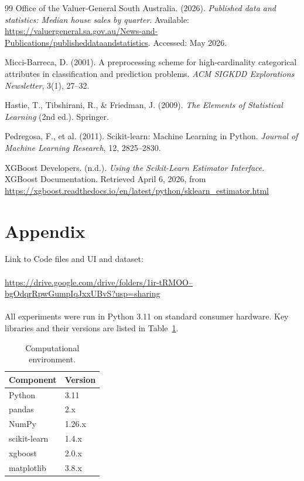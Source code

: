 \documentclass[a4paper,12pt]{article}
\begin{document}
\begin{thebibliography}{99}
Office of the Valuer-General South Australia. (2026). \emph{Published data and statistics: Median house sales by quarter}. Available: \url{https://valuergeneral.sa.gov.au/News-and-Publications/publisheddataandstatistics}. Accessed: May 2026.

Micci-Barreca, D. (2001). A preprocessing scheme for high-cardinality categorical attributes in classification and prediction problems. \emph{ACM SIGKDD Explorations Newsletter}, 3(1), 27--32.

Hastie, T., Tibshirani, R., \& Friedman, J. (2009). \emph{The Elements of Statistical Learning} (2nd ed.). Springer.

Pedregosa, F., et al. (2011). Scikit-learn: Machine Learning in Python. \emph{Journal of Machine Learning Research}, 12, 2825--2830.

XGBoost Developers. (n.d.). \emph{Using the Scikit-Learn Estimator Interface}. XGBoost Documentation. Retrieved April 6, 2026, from \url{https://xgboost.readthedocs.io/en/latest/python/sklearn_estimator.html}

\end{thebibliography}

\appendix

\section{Appendix}
Link to Code files and UI and dataset:
\\
\\
\href{https://drive.google.com/drive/folders/1ir-tRMOO--bgOdqrRpwGumpIqJxxUBvS?usp=sharing}{https://drive.google.com/drive/folders/1ir-tRMOO--bgOdqrRpwGumpIqJxxUBvS?usp=sharing}
\\
\\
All experiments were run in Python 3.11 on standard consumer hardware. Key libraries and their versions are listed in Table~\ref{tab:envstack}.

\begin{table}[H]
\centering
\caption{Computational environment.}
\label{tab:envstack}
\begin{tabular}{@{}ll@{}}
\toprule
\textbf{Component} & \textbf{Version} \\
\midrule
Python & 3.11 \\
pandas & 2.x \\
NumPy & 1.26.x \\
scikit-learn & 1.4.x \\
xgboost & 2.0.x \\
matplotlib & 3.8.x \\
\bottomrule
\end{tabular}
\end{table}
\end{document}
